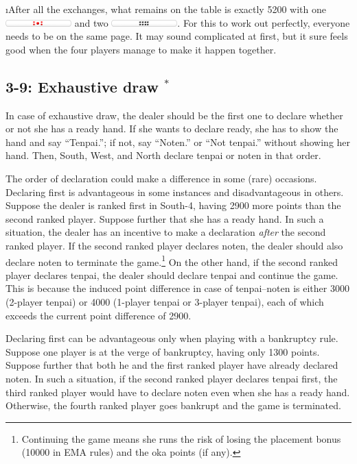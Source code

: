 \i After all the exchanges, what remains on the table is exactly 5200 with one \includegraphics[width=1in]{figs/tenbou5000} and two \includegraphics[width=1in]{figs/tenbou100}.
\ee
For this to work out perfectly, everyone needs to be on the same page. It may sound complicated at first, but it sure feels good when the four players manage to make it happen together. 

\subsection*{3-9: Exhaustive draw $^{*}$}
In case of exhaustive draw, the dealer should be the first one to declare whether or not she has a ready hand. If she wants to declare ready, she has to show the hand and say ``{\jap Tenpai}.''; if not, say ``{\jap Noten}.'' or ``Not {\jap tenpai}.'' without showing her hand. Then, South, West, and North declare {\jap tenpai} or {\jap noten} in that order. 

\bigskip
The order of declaration could make a difference in some (rare) occasions. Declaring first is advantageous in some instances and disadvantageous in others. Suppose the dealer is ranked first in South-4, having 2900 more points than the second ranked player. Suppose further that she has a ready hand. In such a situation, the dealer has an incentive to make a declaration \emph{after} the second ranked player. If the second ranked player declares {\jap noten}, the dealer should also declare {\jap noten} to terminate the game.\footnote{Continuing the game means she runs the risk of losing the placement bonus (10000 in EMA rules) and the {\jap oka} points (if any).} On the other hand, if the second ranked player declares {\jap tenpai}, the dealer should declare {\jap tenpai} and continue the game. This is because the induced point difference in case of {\jap tenpai}--{\jap noten} is either 3000 (2-player {\jap tenpai}) or 4000 (1-player {\jap tenpai} or 3-player {\jap tenpai}), each of which exceeds the current point difference of 2900. 

\bigskip
Declaring first can be advantageous only when playing with a bankruptcy rule. Suppose one player is at the verge of bankruptcy, having only 1300 points. Suppose further that both he and the first ranked player have already declared {\jap noten}. 
In such a situation, if the second ranked player declares {\jap tenpai} first, the third ranked player would have to declare {\jap noten} even when she has a ready hand. Otherwise, the fourth ranked player goes bankrupt and the game is terminated.

